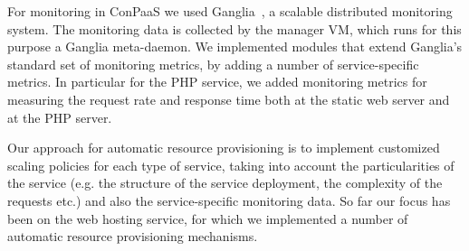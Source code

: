 
For monitoring in ConPaaS we used Ganglia~\cite{ganglia}, a scalable 
distributed monitoring system. The monitoring data is collected by
the manager VM, which runs for this purpose a Ganglia meta-daemon. We implemented modules that extend Ganglia's standard
set of monitoring metrics, by adding a number of service-specific
metrics. In particular for the PHP service, we added monitoring metrics
for measuring the request rate and response time both at the static web
server and at the PHP server.


Our approach for automatic resource provisioning is to implement
customized scaling policies for each type of service, taking
into account the particularities of the service (e.g. the structure
of the service deployment, the complexity of the requests etc.)
and also the service-specific monitoring data. So far our focus 
has been on the web hosting service, for which we implemented a number of
automatic resource provisioning mechanisms.

